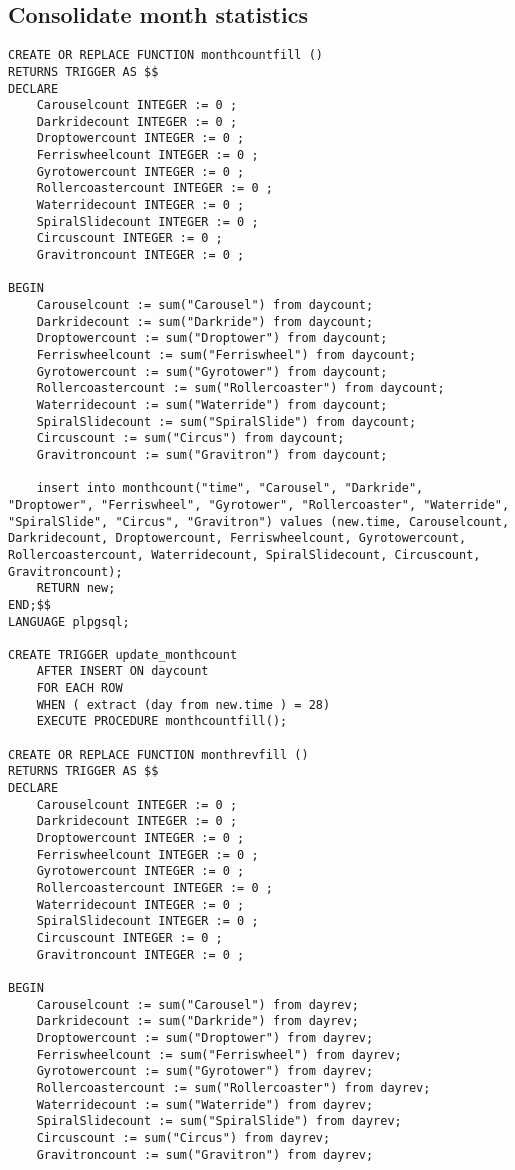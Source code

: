 \subsection{Consolidate month statistics}
\begin{lstlisting}
CREATE OR REPLACE FUNCTION monthcountfill ()
RETURNS TRIGGER AS $$
DECLARE
    Carouselcount INTEGER := 0 ;
    Darkridecount INTEGER := 0 ;
    Droptowercount INTEGER := 0 ;
    Ferriswheelcount INTEGER := 0 ;
    Gyrotowercount INTEGER := 0 ;
    Rollercoastercount INTEGER := 0 ;
    Waterridecount INTEGER := 0 ;
    SpiralSlidecount INTEGER := 0 ;
    Circuscount INTEGER := 0 ;
    Gravitroncount INTEGER := 0 ;

BEGIN
    Carouselcount := sum("Carousel") from daycount;
    Darkridecount := sum("Darkride") from daycount;
    Droptowercount := sum("Droptower") from daycount;
    Ferriswheelcount := sum("Ferriswheel") from daycount;
    Gyrotowercount := sum("Gyrotower") from daycount;
    Rollercoastercount := sum("Rollercoaster") from daycount;
    Waterridecount := sum("Waterride") from daycount;
    SpiralSlidecount := sum("SpiralSlide") from daycount;
    Circuscount := sum("Circus") from daycount;
    Gravitroncount := sum("Gravitron") from daycount;

    insert into monthcount("time", "Carousel", "Darkride", "Droptower", "Ferriswheel", "Gyrotower", "Rollercoaster", "Waterride", "SpiralSlide", "Circus", "Gravitron") values (new.time, Carouselcount, Darkridecount, Droptowercount, Ferriswheelcount, Gyrotowercount, Rollercoastercount, Waterridecount, SpiralSlidecount, Circuscount, Gravitroncount);
    RETURN new;
END;$$
LANGUAGE plpgsql;

CREATE TRIGGER update_monthcount
    AFTER INSERT ON daycount
    FOR EACH ROW
    WHEN ( extract (day from new.time ) = 28)
    EXECUTE PROCEDURE monthcountfill();

CREATE OR REPLACE FUNCTION monthrevfill ()
RETURNS TRIGGER AS $$
DECLARE
    Carouselcount INTEGER := 0 ;
    Darkridecount INTEGER := 0 ;
    Droptowercount INTEGER := 0 ;
    Ferriswheelcount INTEGER := 0 ;
    Gyrotowercount INTEGER := 0 ;
    Rollercoastercount INTEGER := 0 ;
    Waterridecount INTEGER := 0 ;
    SpiralSlidecount INTEGER := 0 ;
    Circuscount INTEGER := 0 ;
    Gravitroncount INTEGER := 0 ;

BEGIN
    Carouselcount := sum("Carousel") from dayrev;
    Darkridecount := sum("Darkride") from dayrev;
    Droptowercount := sum("Droptower") from dayrev;
    Ferriswheelcount := sum("Ferriswheel") from dayrev;
    Gyrotowercount := sum("Gyrotower") from dayrev;
    Rollercoastercount := sum("Rollercoaster") from dayrev;
    Waterridecount := sum("Waterride") from dayrev;
    SpiralSlidecount := sum("SpiralSlide") from dayrev;
    Circuscount := sum("Circus") from dayrev;
    Gravitroncount := sum("Gravitron") from dayrev;


\end{lstlisting}
